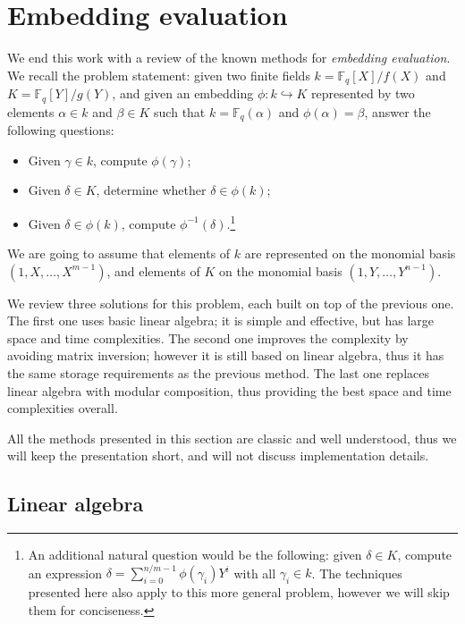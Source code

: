 \documentclass[12pt]{article}
\theoremstyle{plain}
\theoremstyle{definition}
\def\F{\ensuremath{\mathbb{F}}}
\begin{document}

\section{Embedding evaluation}
\label{sec:eval}

We end this work with a review of the known methods for
\emph{embedding evaluation}. %
We recall the problem statement: given two finite fields
$k=\F_q[X]/f(X)$ and $K=\F_q[Y]/g(Y)$, and given an embedding
$\phi:k\hookrightarrow K$ represented by two elements $\alpha\in k$
and $\beta\in K$ such that $k=\F_q(\alpha)$ and $\phi(\alpha)=\beta$,
answer the following questions:
\begin{itemize}
\item Given $\gamma\in k$, compute $\phi(\gamma)$;
\item Given $\delta\in K$, determine whether $\delta\in\phi(k)$;
\item Given $\delta\in\phi(k)$, compute
  $\phi^{-1}(\delta)$.\footnote{An additional natural question would
    be the following: given $\delta\in K$, compute an expression
    $\delta=\sum_{i=0}^{n/m-1} \phi(\gamma_i) Y^i$ with all
    $\gamma_i\in k$. The techniques presented here also apply to this
    more general problem, however we will skip them for conciseness.}
\end{itemize}
We are going to assume that elements of $k$ are represented on the
monomial basis $(1,X,\dots,X^{m-1})$, and elements of $K$ on the
monomial basis $(1,Y,\dots,Y^{n-1})$.

We review three solutions for this problem, each built on top
of the previous one. %
The first one uses basic linear algebra; it is simple and effective,
but has large space and time complexities. %
The second one improves the complexity by avoiding matrix inversion;
however it is still based on linear algebra, thus it has the same
storage requirements as the previous method. %
The last one replaces linear algebra with modular composition, thus
providing the best space and time complexities overall. 

All the methods presented in this section are classic and well
understood, thus we will keep the presentation short, and will not
discuss implementation details.

\subsection{Linear algebra}
\label{sec:linear-algebra}
\end{document}
